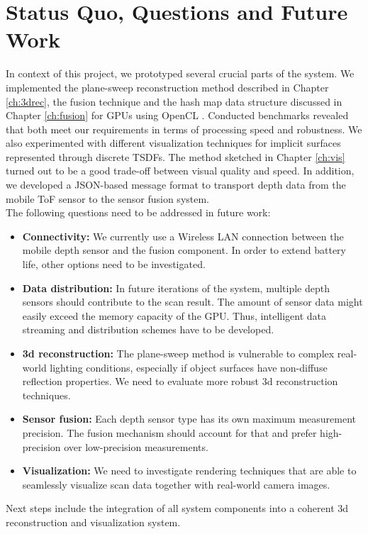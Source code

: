 \documentclass[conference]{IEEEtran}
\begin{document}
\section {Status Quo, Questions and Future Work}
In context of this project, we prototyped several crucial parts of the system. 
We implemented the plane-sweep reconstruction method described in Chapter \ref{ch:3drec}, the fusion technique and the hash map data structure discussed in Chapter \ref{ch:fusion} for GPUs using OpenCL \cite{opencl11spec}. 
Conducted benchmarks revealed that both meet our requirements in terms of processing speed and robustness.
We also experimented with different visualization techniques for implicit surfaces represented through discrete TSDFs.
The method sketched in Chapter \ref{ch:vis} turned out to be a good trade-off between visual quality and speed.
In addition, we developed a JSON-based message format to transport depth data from the mobile ToF sensor to the sensor fusion system. 
\\
The following questions need to be addressed in future work: 
\begin{itemize}
\item \textbf{Connectivity:} We currently use a Wireless LAN connection between the mobile depth sensor and the fusion component. In order to extend battery life, other options need to be investigated.
\item \textbf{Data distribution:} In future iterations of the system, multiple depth sensors should contribute to the scan result. 
The amount of sensor data might easily exceed the memory capacity of the GPU. 
Thus, intelligent data streaming and distribution schemes have to be developed.
\item \textbf{3d reconstruction:} The plane-sweep method is vulnerable to complex real-world lighting conditions, especially if object surfaces have non-diffuse reflection properties. 
We need to evaluate more robust 3d reconstruction techniques.
\item \textbf{Sensor fusion:} Each depth sensor type has its own maximum measurement precision.
The fusion mechanism should account for that and prefer high-precision over low-precision measurements. 
\item \textbf{Visualization:} We need to investigate rendering techniques that are able to seamlessly visualize scan data together with real-world camera images. 
\end{itemize}
Next steps include the integration of all system components into a coherent 3d reconstruction and visualization system.
\end{document}

